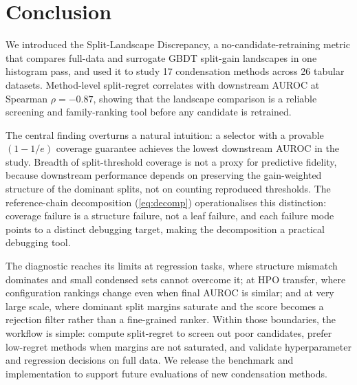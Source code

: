 
\section{Conclusion}
\label{sec:conclusion}

We introduced the Split-Landscape Discrepancy, a no-candidate-retraining metric
that compares full-data and surrogate GBDT split-gain landscapes in one
histogram pass, and used it to study 17 condensation methods across 26 tabular
datasets. Method-level split-regret correlates with downstream AUROC at
Spearman $\rho=-0.87$, showing that the landscape comparison is a reliable
screening and family-ranking tool before any candidate is retrained.

The central finding overturns a natural intuition: a selector with a provable
$(1-1/e)$ coverage guarantee achieves the lowest downstream AUROC in the
study. Breadth of split-threshold coverage is not a proxy for predictive
fidelity, because downstream performance depends on preserving the
gain-weighted structure of the dominant splits, not on counting reproduced
thresholds. The reference-chain
decomposition (\cref{eq:decomp}) operationalises this distinction: coverage
failure is a structure failure, not a leaf failure, and each failure mode points
to a distinct debugging target, making the decomposition a practical debugging
tool.

The diagnostic reaches its limits at regression tasks, where structure mismatch
dominates and small condensed sets cannot overcome it; at HPO transfer, where
configuration rankings change even when final AUROC is similar; and at very
large scale, where dominant split margins saturate and the score becomes a
rejection filter rather than a fine-grained ranker. Within those boundaries,
the workflow is simple: compute split-regret to screen out poor candidates,
prefer low-regret methods when margins are not saturated, and validate
hyperparameter and regression decisions on full data. We release the benchmark
and implementation to support future evaluations of new condensation methods.
